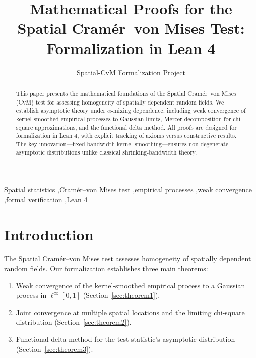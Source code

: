 \documentclass[final,3p,twocolumn,times,authoryear]{elsarticle}
\theoremstyle{definition}
\begin{document}
\begin{frontmatter}

\title{Mathematical Proofs for the Spatial Cramér--von Mises Test:\\Formalization in Lean 4}

\author[1]{Spatial-CvM Formalization Project}


\begin{abstract}
This paper presents the mathematical foundations of the Spatial Cramér--von Mises (CvM) test for assessing homogeneity of spatially dependent random fields. We establish asymptotic theory under $\alpha$-mixing dependence, including weak convergence of kernel-smoothed empirical processes to Gaussian limits, Mercer decomposition for chi-square approximations, and the functional delta method. All proofs are designed for formalization in Lean 4, with explicit tracking of axioms versus constructive results. The key innovation---fixed bandwidth kernel smoothing---ensures non-degenerate asymptotic distributions unlike classical shrinking-bandwidth theory.
\end{abstract}

\begin{keyword}
Spatial statistics \sep Cramér--von Mises test \sep empirical processes \sep weak convergence \sep formal verification \sep Lean 4
\end{keyword}

\end{frontmatter}

\section{Introduction}
\label{sec:intro}

The Spatial Cramér--von Mises test assesses homogeneity of spatially dependent random fields. Our formalization establishes three main theorems:

\begin{enumerate}
    \item[\textbf{T1}] Weak convergence of the kernel-smoothed empirical process to a Gaussian process in $\ell^\infty[0,1]$ (Section~\ref{sec:theorem1}).
    \item[\textbf{T2}] Joint convergence at multiple spatial locations and the limiting chi-square distribution (Section~\ref{sec:theorem2}).
    \item[\textbf{T3}] Functional delta method for the test statistic's asymptotic distribution (Section~\ref{sec:theorem3}).
\end{enumerate}
\end{document}
